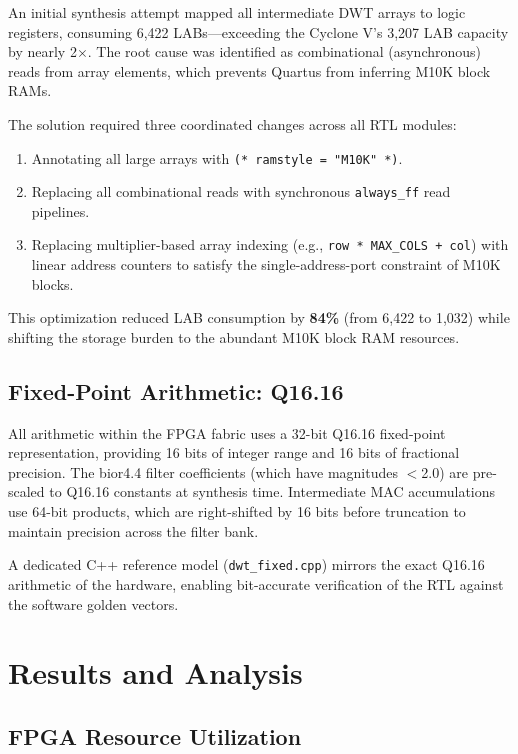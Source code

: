 \documentclass[conference]{IEEEtran}
\begin{document}
An initial synthesis attempt mapped all intermediate DWT arrays to logic registers, consuming 6,422 LABs---exceeding the Cyclone V's 3,207 LAB capacity by nearly 2$\times$. The root cause was identified as combinational (asynchronous) reads from array elements, which prevents Quartus from inferring M10K block RAMs.

The solution required three coordinated changes across all RTL modules:
\begin{enumerate}
    \item Annotating all large arrays with \texttt{(* ramstyle = "M10K" *)}.
    \item Replacing all combinational reads with synchronous \texttt{always\_ff} read pipelines.
    \item Replacing multiplier-based array indexing (e.g., \texttt{row * MAX\_COLS + col}) with linear address counters to satisfy the single-address-port constraint of M10K blocks.
\end{enumerate}

This optimization reduced LAB consumption by \textbf{84\%} (from 6,422 to 1,032) while shifting the storage burden to the abundant M10K block RAM resources.

\subsection{Fixed-Point Arithmetic: Q16.16}

All arithmetic within the FPGA fabric uses a 32-bit Q16.16 fixed-point representation, providing 16 bits of integer range and 16 bits of fractional precision. The bior4.4 filter coefficients (which have magnitudes $<$2.0) are pre-scaled to Q16.16 constants at synthesis time. Intermediate MAC accumulations use 64-bit products, which are right-shifted by 16 bits before truncation to maintain precision across the filter bank.

A dedicated C++ reference model (\texttt{dwt\_fixed.cpp}) mirrors the exact Q16.16 arithmetic of the hardware, enabling bit-accurate verification of the RTL against the software golden vectors.

\section{Results and Analysis}

\subsection{FPGA Resource Utilization}
\end{document}
